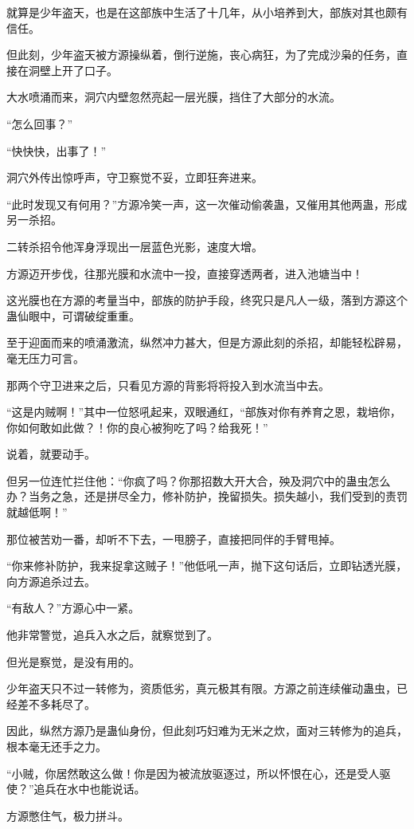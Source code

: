 \begin{this_body}
就算是少年盗天，也是在这部族中生活了十几年，从小培养到大，部族对其也颇有信任。

但此刻，少年盗天被方源操纵着，倒行逆施，丧心病狂，为了完成沙枭的任务，直接在洞壁上开了口子。

大水喷涌而来，洞穴内壁忽然亮起一层光膜，挡住了大部分的水流。

“怎么回事？”

“快快快，出事了！”

洞穴外传出惊呼声，守卫察觉不妥，立即狂奔进来。

“此时发现又有何用？”方源冷笑一声，这一次催动偷袭蛊，又催用其他两蛊，形成另一杀招。

二转杀招令他浑身浮现出一层蓝色光影，速度大增。

方源迈开步伐，往那光膜和水流中一投，直接穿透两者，进入池塘当中！

这光膜也在方源的考量当中，部族的防护手段，终究只是凡人一级，落到方源这个蛊仙眼中，可谓破绽重重。

至于迎面而来的喷涌激流，纵然冲力甚大，但是方源此刻的杀招，却能轻松辟易，毫无压力可言。

那两个守卫进来之后，只看见方源的背影将将投入到水流当中去。

“这是内贼啊！”其中一位怒吼起来，双眼通红，“部族对你有养育之恩，栽培你，你如何敢如此做？！你的良心被狗吃了吗？给我死！”

说着，就要动手。

但另一位连忙拦住他：“你疯了吗？你那招数大开大合，殃及洞穴中的蛊虫怎么办？当务之急，还是拼尽全力，修补防护，挽留损失。损失越小，我们受到的责罚就越低啊！”

那位被苦劝一番，却听不下去，一甩膀子，直接把同伴的手臂甩掉。

“你来修补防护，我来捉拿这贼子！”他低吼一声，抛下这句话后，立即钻透光膜，向方源追杀过去。

“有敌人？”方源心中一紧。

他非常警觉，追兵入水之后，就察觉到了。

但光是察觉，是没有用的。

少年盗天只不过一转修为，资质低劣，真元极其有限。方源之前连续催动蛊虫，已经差不多耗尽了。

因此，纵然方源乃是蛊仙身份，但此刻巧妇难为无米之炊，面对三转修为的追兵，根本毫无还手之力。

“小贼，你居然敢这么做！你是因为被流放驱逐过，所以怀恨在心，还是受人驱使？”追兵在水中也能说话。

方源憋住气，极力拼斗。


\end{this_body}
